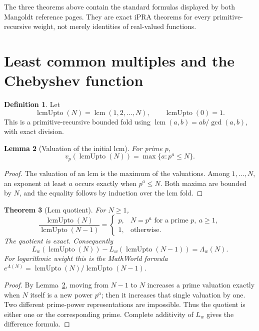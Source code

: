 \documentclass[11pt]{article}
\newtheorem{theorem}{Theorem}[section]
\newtheorem{lemma}[theorem]{Lemma}
\theoremstyle{definition}
\newtheorem{definition}[theorem]{Definition}
\newcommand{\ipra}{\mathrm{iPRA}}
\newcommand{\lcmu}{\operatorname{lcmUpto}}
\begin{document}
The three theorems above contain the standard formulas displayed by both
Mangoldt reference pages.  They are exact \(\ipra\) theorems for every
primitive-recursive weight, not merely identities of real-valued functions.

\section{Least common multiples and the Chebyshev function}

\begin{definition}
Let
\[
 \lcmu(N)=\operatorname{lcm}(1,2,\ldots,N),
 \qquad \lcmu(0)=1.
\]
This is a primitive-recursive bounded fold using
\(\operatorname{lcm}(a,b)=ab/\gcd(a,b)\), with exact division.
\end{definition}

\begin{lemma}[Valuation of the initial lcm]\label{lem:lcm-valuation}
For prime \(p\),
\[
 v_p(\lcmu(N))=\max\{a:p^a\le N\}.
\]
\end{lemma}

\begin{proof}
The valuation of an lcm is the maximum of the valuations.  Among
\(1,\ldots,N\), an exponent at least \(a\) occurs exactly when \(p^a\le N\).
Both maxima are bounded by \(N\), and the equality follows by induction over
the lcm fold.
\end{proof}

\begin{theorem}[Lcm quotient]\label{thm:lcm-quotient}
For \(N\ge1\),
\[
 \frac{\lcmu(N)}{\lcmu(N-1)}=
 \begin{cases}
 p,&N=p^a\text{ for a prime }p,\ a\ge1,\\
 1,&\text{otherwise}.
 \end{cases}
\]
The quotient is exact.  Consequently
\[
 L_w(\lcmu(N))-L_w(\lcmu(N-1))=\Lambda_w(N).
\]
For logarithmic weight this is the MathWorld formula
\(e^{\Lambda(N)}=\lcmu(N)/\lcmu(N-1)\).
\end{theorem}

\begin{proof}
By Lemma~\ref{lem:lcm-valuation}, moving from \(N-1\) to \(N\) increases a
prime valuation exactly when \(N\) itself is a new power \(p^a\); then it
increases that single valuation by one.  Two different prime-power
representations are impossible.  Thus the quotient is either one or the
corresponding prime.  Complete additivity of \(L_w\) gives the difference
formula.
\end{proof}
\end{document}
